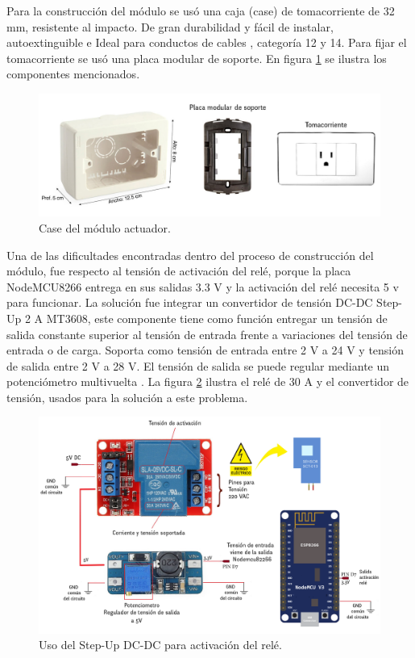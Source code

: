 Para la construcción del módulo se usó una caja (case) de tomacorriente de 32 mm, resistente al impacto. De gran durabilidad y fácil de instalar, autoextinguible e Ideal para conductos de cables \citep{WEBSITE:18}, categoría 12 y 14. Para fijar el tomacorriente se usó una placa modular de soporte. En figura \ref{fig:caseactuador} se ilustra los componentes mencionados.

\begin{figure}[htpb]
\centering 
\includegraphics[width=1.0\textwidth]{./Figures/actuador.jpg}
\caption{Case del módulo actuador.}
\label{fig:caseactuador}
\end{figure}



Una de las dificultades encontradas dentro del proceso de construcción del módulo, fue respecto al tensión de activación del relé, porque la placa NodeMCU8266 entrega en sus salidas 3.3 V y la activación del relé necesita 5 v para funcionar. La solución fue integrar un convertidor de tensión DC-DC Step-Up 2 A MT3608, este componente tiene como función entregar un tensión de salida constante superior al tensión de entrada frente a variaciones del tensión de entrada o de carga. Soporta como tensión de entrada entre 2 V a 24 V y tensión de salida entre 2 V a 28 V. El tensión de salida se puede regular mediante un potenciómetro multivuelta \citep{WEBSITE:19}. La figura \ref{fig:esquemaactuador} ilustra el relé de 30 A y el convertidor de tensión, usados para la solución a este problema.

\begin{figure}[htpb]
\centering 
\includegraphics[width=1.057\textwidth]{./Figures/esquemaactuador.png}
\caption{Uso del Step-Up DC-DC para activación del relé. }
\label{fig:esquemaactuador}
\end{figure}


